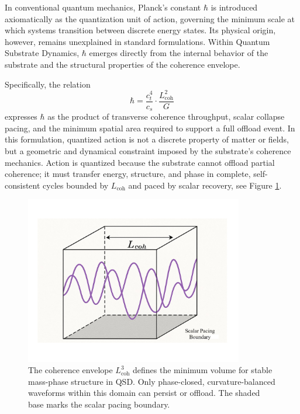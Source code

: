 \documentclass[entropy,article,submit,pdftex,oneauthor]{Definitions/mdpi}
\begin{document}
In conventional quantum mechanics, Planck’s constant \texorpdfstring{\( \hbar \)}{hbar} is introduced axiomatically as the quantization unit of action, governing the minimum scale at which systems transition between discrete energy states. Its physical origin, however, remains unexplained in standard formulations. Within Quantum Substrate Dynamics, \texorpdfstring{\( \hbar \)}{hbar} emerges directly from the internal behavior of the substrate and the structural properties of the coherence envelope.

Specifically, the relation
\[
\hbar = \frac{c_t^4}{c_s} \cdot \frac{L_{\text{coh}}^2}{G}
\]
expresses \texorpdfstring{\( \hbar \)}{hbar} as the product of transverse coherence throughput, scalar collapse pacing, and the minimum spatial area required to support a full offload event. In this formulation, quantized action is not a discrete property of matter or fields, but a geometric and dynamical constraint imposed by the substrate’s coherence mechanics. Action is quantized because the substrate cannot offload partial coherence; it must transfer energy, structure, and phase in complete, self-consistent cycles bounded by \texorpdfstring{\( L_{\text{coh}} \)}{Lcoh} and paced by scalar recovery, see Figure \ref{fig:lcoh}.

\begin{figure}[htbp]
\centering
\includegraphics[width=0.85\textwidth]{figures/Lcoh.pdf}
\caption{The coherence envelope \( L_{\text{coh}}^3 \) defines the minimum volume for stable mass-phase structure in QSD. Only phase-closed, curvature-balanced waveforms within this domain can persist or offload. The shaded base marks the scalar pacing boundary.}
\label{fig:lcoh}
\end{figure}
\end{document}
